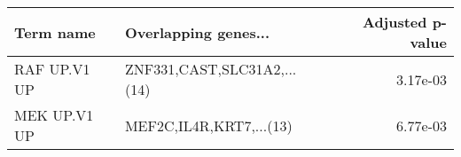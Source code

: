 \begin{tabular}{llr}
\toprule
   Term name &        Overlapping genes... &  Adjusted p-value \\
\midrule
RAF UP.V1 UP & ZNF331,CAST,SLC31A2,...(14) &          3.17e-03 \\
MEK UP.V1 UP &     MEF2C,IL4R,KRT7,...(13) &          6.77e-03 \\
\bottomrule
\end{tabular}
